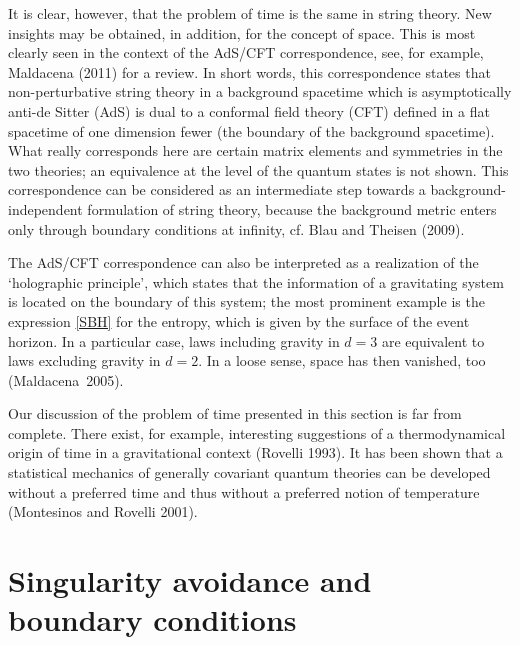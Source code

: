 \documentclass[12pt,a4paper]{article}
\begin{document}
It is clear, however, that the problem of time is the same in string
theory. New insights may be obtained, in addition, for the concept of
space. This 
is most clearly seen in the context of the AdS/CFT correspondence,
see, for example, Maldacena (2011) for a review. 
In short words, this correspondence states that 
non-perturbative string theory in
  a background spacetime which is asymptotically anti-de Sitter (AdS)
  is dual to a conformal field theory (CFT) defined in a flat
  spacetime of one dimension fewer (the boundary of the background
  spacetime). What really corresponds here are certain matrix elements
  and symmetries in the two theories; an equivalence at the level of
  the quantum states is not shown.
This correspondence can be considered as an intermediate step towards
a background-independent formulation of 
string theory, because the background metric enters only through boundary
conditions at infinity, cf. Blau and Theisen (2009). 

The AdS/CFT correspondence can also be interpreted as a 
realization of the `holographic principle', which states that the
information of a gravitating system is located on the boundary of this
system; the most prominent example is the expression \eqref{SBH} for
the entropy, which is given by the surface of the event horizon. In a
particular case, 
laws including gravity in $d=3$ are equivalent to laws
excluding gravity in $d=2$.
In a loose sense, space has then vanished, too (Maldacena~2005). 

Our discussion of the problem of time presented in this section is far
from complete. There exist, for example, interesting suggestions of a
thermodynamical origin of time in a gravitational context (Rovelli
1993). It has been shown that a statistical mechanics of generally
covariant quantum theories can be developed without a preferred time
and thus without a preferred notion of temperature (Montesinos and
Rovelli 2001).  


\section{Singularity avoidance and boundary conditions}
\end{document}
